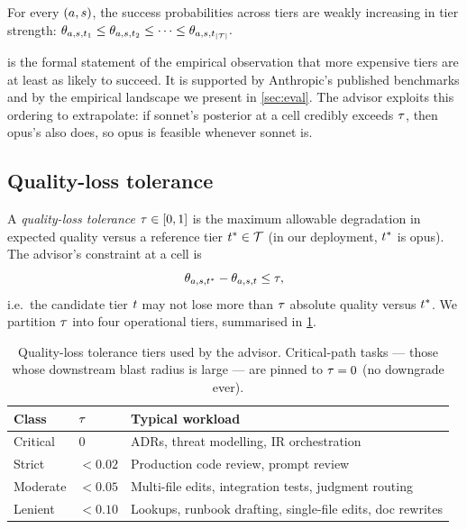 \begin{assumption}
\label{assumption:order}
For every $(a, s)$, the success probabilities across tiers are
weakly increasing in tier strength:
\(
  \theta_{a,s,t_1} \leq \theta_{a,s,t_2} \leq
  \cdots \leq \theta_{a,s,t_{|\mathcal{T}|}}.
\)
\end{assumption}

 is the formal statement of the empirical observation
that more expensive tiers are at least as likely to succeed. It is supported
by Anthropic's published benchmarks \cite{anthropic2024modelcards} and by the
empirical landscape we present in \cref{sec:eval}. The advisor exploits this
ordering to extrapolate: if sonnet's posterior at a cell credibly exceeds
$\tau$, then opus's also does, so opus is feasible whenever sonnet is.

\subsection{Quality-loss tolerance}

A \emph{quality-loss tolerance} $\tau \in [0,1]$ is the maximum
allowable degradation in expected quality versus a reference tier
$t^* \in \mathcal{T}$ (in our deployment, $t^*$ is opus). The advisor's
constraint at a cell is
\begin{equation}
  \theta_{a,s,t^*} - \theta_{a,s,t} \leq \tau,
  \label{eq:tolerance-constraint}
\end{equation}
i.e.\ the candidate tier $t$ may not lose more than $\tau$
absolute quality versus $t^*$. We partition $\tau$ into four
operational tiers, summarised in \cref{tab:tolerance-tiers}.

\begin{table}[h]
\centering
\caption{Quality-loss tolerance tiers used by the advisor. Critical-path
tasks --- those whose downstream blast radius is large --- are pinned to
$\tau = 0$ (no downgrade ever).}
\label{tab:tolerance-tiers}
\begin{tabular}{lll}
\toprule
\textbf{Class} & \textbf{$\tau$} & \textbf{Typical workload} \\
\midrule
Critical & $0$              & ADRs, threat modelling, IR orchestration \\
Strict   & $< 0.02$         & Production code review, prompt review \\
Moderate & $< 0.05$         & Multi-file edits, integration tests, judgment routing \\
Lenient  & $< 0.10$         & Lookups, runbook drafting, single-file edits, doc rewrites \\
\bottomrule
\end{tabular}
\end{table}

